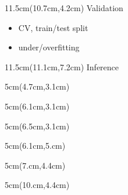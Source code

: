 \documentclass[aspectratio=169,usenames,dvipsnames]{beamer}
\begin{document}
\begin{frame}
\begin{textblock*}{11.5cm}(10.7cm,4.2cm)
	\Large
	\hspace{4mm}\textcolor{myorange}{Validation}
	\vspace{2mm}
	\begin{itemize}
		\footnotesize
		\item[$\circ$] CV, train/test split
		\item[?] under/overfitting
	\end{itemize}
\end{textblock*}

\begin{textblock*}{11.5cm}(11.1cm,7.2cm)
	\Large
	\textcolor{myorange}{Inference}
\end{textblock*}


\begin{textblock*}{5cm}(4.7cm,3.1cm)
\end{textblock*}

\begin{textblock*}{5cm}(6.1cm,3.1cm)
\end{textblock*}

\begin{textblock*}{5cm}(6.5cm,3.1cm)
\end{textblock*}


\begin{textblock*}{5cm}(6.1cm,5.cm)
\end{textblock*}


\begin{textblock*}{5cm}(7.cm,4.4cm)
\end{textblock*}

\begin{textblock*}{5cm}(10.cm,4.4cm)
\end{textblock*}


\end{frame}
\end{document}
